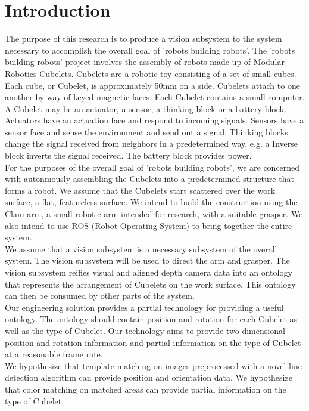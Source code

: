 \documentclass[conference]{IEEEtran}
\begin{document}




%
\IEEEpeerreviewmaketitle



\section{Introduction}
The purpose of this research is to produce a vision subsystem to the system necessary to accomplish the overall goal of 'robots building robots'.  The 'robots building robots' project involves the assembly of robots made up of Modular Robotics Cubelets. Cubelets are a robotic toy consisting of a set of small cubes. Each cube, or Cubelet, is approximately 50mm on a side. Cubelets attach to one another by way of keyed magnetic faces. Each Cubelet contains a small computer. A Cubelet may be an actuator, a sensor, a thinking block or a battery block. Actuators have an actuation face and respond to incoming signals. Sensors have a sensor face and sense the environment and send out a signal. Thinking blocks change the signal received from neighbors in a predetermined way, e.g. a Inverse block inverts the signal received. The battery block provides power.
\\[6pt]
For the purposes of the overall goal of 'robots building robots', we are concerned with autonmously assembling the Cubelets into a predetermined structure that forms a robot. We assume that the Cubelets start scattered over the work surface, a flat, featureless surface. We intend to build the construction using the Clam arm, a small robotic arm intended for research, with a suitable grasper. We also intend to use ROS (Robot Operating System) to bring together the entire system.
\\[6pt]
We assume that a vision subsystem is a necessary subsystem of the overall system. The vision subsystem will be used to direct the arm and grasper. The vision subsystem reifies visual and aligned depth camera data into an ontology that represents the arrangement of Cubelets on the work surface. This ontology can then be consumed by other parts of the system.
\\[6pt]
Our engineering solution provides a partial technology for providing a useful ontology. The ontology should contain position and rotation for each Cubelet as well as the type of Cubelet. Our technology aims to provide two dimensional position and rotation information and partial information on the type of Cubelet at a reasonable frame rate.
\\[6pt]
We hypothesize that template matching on images preprocessed with a novel line detection algorithm can provide position and orientation data. We hypothesize that color matching on matched areas can provide partial information on the type of Cubelet.
\end{document}
